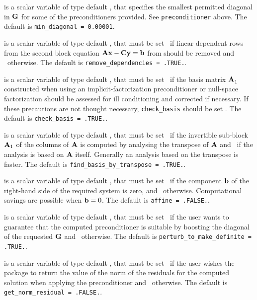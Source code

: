 \documentclass{galahad}
\begin{document}
\begin{description}


 is a scalar variable of type default \realdp,
that specifies the smallest permitted diagonal in ${\mathbf{G}}$ for some
of the preconditioners provided. See {\tt preconditioner} above.
The default is {\tt min\_diagonal = 0.00001}.

 is a scalar variable of type default \logical,
that must be set \true\ if linear dependent rows from the second
block equation ${\mathbf{A}} {\mathbf{x}} - {\mathbf{C}} {\mathbf{y}} = {\mathbf{b}}$ from 
should be removed and \false\ otherwise.
The default is {\tt remove\_dependencies = .TRUE.}.

 is a scalar variable of type default \logical,
that must be set \true\ if the basis matrix ${\mathbf{A}}_{1}^{}$ constructed
when using an implicit-factorization preconditioner or null-space factorization
should be assessed for ill conditioning and corrected if necessary. If these
precautions are not thought necessary, {\tt check\_basis} should be
set \false. The default is {\tt check\_basis = .TRUE.}.

 is a scalar variable of type default \logical,
that must be set \true\ if the invertible sub-block ${\mathbf{A}}_1$ of the
columns of ${\mathbf{A}}$ is computed by analysing the transpose of ${\mathbf{A}}$
and \false\ if the analysis is based on ${\mathbf{A}}$ itself. Generally
an analysis based on the transpose is faster.
The default is {\tt find\_basis\_by\_transpose = .TRUE.}.

 is a scalar variable of type default \logical,
that must be set \true\ if the component ${\mathbf{b}}$ of the right-hand side
of the required system  is zero, and \false\ otherwise.
Computational savings are possible when ${\mathbf{b}} = 0$.
The default is {\tt affine = .FALSE.}.

 is a scalar variable of type default \logical,
that must be set \true\ if the user wants to guarantee that the
computed preconditioner is suitable by boosting the diagonal of the
requested ${\mathbf{G}}$ and \false\ otherwise.
The default is {\tt perturb\_to\_make\_definite = .TRUE.}.

 is a scalar variable of type default \logical,
that must be set \true\ if the user wishes the package to return
the value of the norm of the residuals for the computed solution
when applying the preconditioner and  \false\ otherwise.
The default is {\tt get\_norm\_residual = .FALSE.}.


\end{description}
\end{document}

